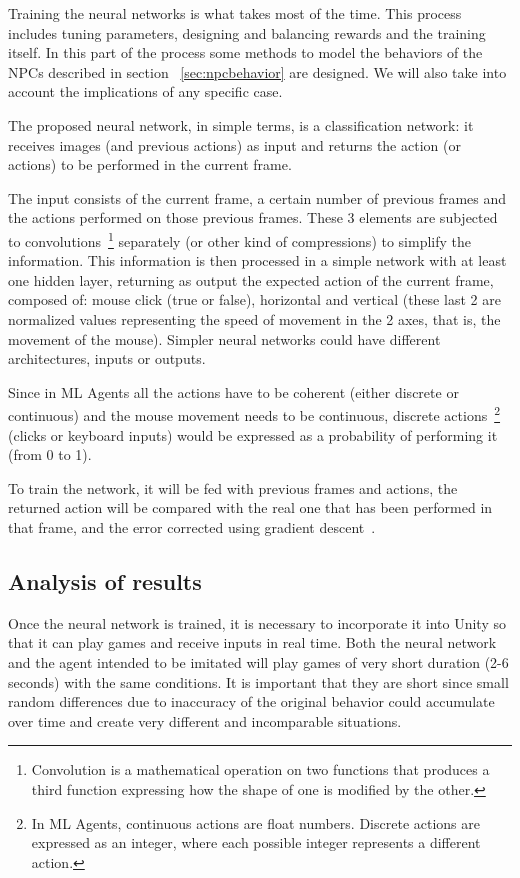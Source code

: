 Training the neural networks is what takes most of the time. This process includes tuning parameters, designing and balancing rewards and the training itself. In this part of the process some methods to model the behaviors of the NPCs described in section ~\ref{sec:npcbehavior} are designed. We will also take into account the implications of any specific case.

The proposed neural network, in simple terms, is a classification network: it receives images (and previous actions) as input and returns the action (or actions) to be performed in the current frame.

The input consists of the current frame, a certain number of previous frames and the actions performed on those previous frames. These 3 elements are subjected to convolutions~\footnote{Convolution is a mathematical operation on two functions that produces a third function expressing how the shape of one is modified by the other.} separately (or other kind of compressions) to simplify the information. This information is then processed in a simple network with at least one hidden layer, returning as output the expected action of the current frame, composed of: mouse click (true or false), horizontal and vertical (these last 2 are normalized values representing the speed of movement in the 2 axes, that is, the movement of the mouse). Simpler neural networks could have different architectures, inputs or outputs.

Since in ML Agents all the actions have to be coherent (either discrete or continuous) and the mouse movement needs to be continuous, discrete actions~\footnote{In ML Agents, continuous actions are float numbers. Discrete actions are expressed as an integer, where each possible integer represents a different action.} (clicks or keyboard inputs) would be expressed as a probability of performing it (from 0 to 1).

To train the network, it will be fed with previous frames and actions, the returned action will be compared with the real one that has been performed in that frame, and the error corrected using gradient descent~\cite{mlagents}.


\subsection{Analysis of results}

Once the neural network is trained, it is necessary to incorporate it into Unity so that it can play games and receive inputs in real time. Both the neural network and the agent intended to be imitated will play games of very short duration (2-6 seconds) with the same conditions. It is important that they are short since small random differences due to inaccuracy of the original behavior could accumulate over time and create very different and incomparable situations.

